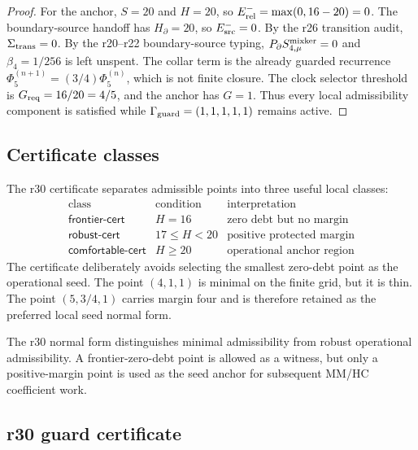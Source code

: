 \begin{proof}
For the anchor, \(S=20\) and \(H=20\), so
\(E_{\rm rel}^{-}=\max(0,16-20)=0\).  The boundary-source handoff has
\(H_{\partial}=20\), so \(E_{\rm src}^{-}=0\).  By the r26 transition audit,
\(\Sigma_{\rm trans}=0\).  By the r20--r22 boundary-source typing,
\(P_{\partial}S_{4,\mu}^{\rm mixker}=0\) and \(\beta_4=1/256\) is left unspent.
The collar term is the already guarded recurrence
\(\Phi_5^{(n+1)}=(3/4)\Phi_5^{(n)}\), which is not finite closure.  The clock
selector threshold is \(G_{\rm req}=16/20=4/5\), and the anchor has \(G=1\).
Thus every local admissibility component is satisfied while
\(\Gamma_{\rm guard}=(1,1,1,1,1)\) remains active.
\end{proof}

\subsection{Certificate classes}
\label{subsec:v470-r30-certificate-classes}

The r30 certificate separates admissible points into three useful local classes:
\[
\boxed{
\begin{array}{c|c|c}
\text{class} & \text{condition} & \text{interpretation}\\
\hline
\mathsf{frontier\mbox{-}cert} & H=16 & \text{zero debt but no margin}\\
\mathsf{robust\mbox{-}cert} & 17\leq H<20 & \text{positive protected margin}\\
\mathsf{comfortable\mbox{-}cert} & H\geq20 & \text{operational anchor region}
\end{array}
}
\]
The certificate deliberately avoids selecting the smallest zero-debt point as the
operational seed.  The point \((4,1,1)\) is minimal on the finite grid, but it is
thin.  The point \((5,3/4,1)\) carries margin four and is therefore retained as
the preferred local seed normal form.

\begin{corollary}
\label{cor:v470-r30-frontier-anchor-separation}
The r30 normal form distinguishes minimal admissibility from robust operational
admissibility.  A frontier-zero-debt point is allowed as a witness, but only a
positive-margin point is used as the seed anchor for subsequent MM/HC coefficient
work.
\end{corollary}

\subsection{r30 guard certificate}
\label{subsec:v470-r30-guard-certificate}


